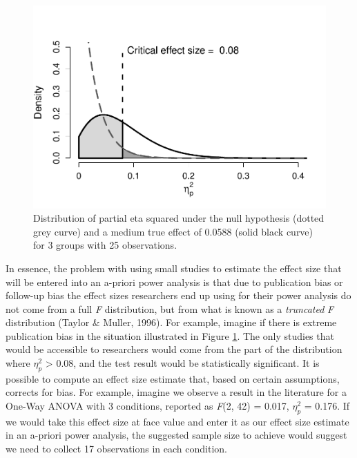 \documentclass[
  english,
  ,jou,floatsintext]{apa6}
\begin{document}
\begin{figure}
\centering
\includegraphics{sample_size_justification_files/figure-latex/follow-up-bias-1.pdf}
\caption{\label{fig:follow-up-bias}Distribution of partial eta squared under the null hypothesis (dotted grey curve) and a medium true effect of 0.0588 (solid black curve) for 3 groups with 25 observations.}
\end{figure}

In essence, the problem with using small studies to estimate the effect size that will be entered into an a-priori power analysis is that due to publication bias or follow-up bias the effect sizes researchers end up using for their power analysis do not come from a full \emph{F} distribution, but from what is known as a \emph{truncated} \emph{F} distribution (Taylor \& Muller, 1996). For example, imagine if there is extreme publication bias in the situation illustrated in Figure \ref{fig:follow-up-bias}. The only studies that would be accessible to researchers would come from the part of the distribution where \(\eta_p^2\) \textgreater{} 0.08, and the test result would be statistically significant. It is possible to compute an effect size estimate that, based on certain assumptions, corrects for bias. For example, imagine we observe a result in the literature for a One-Way ANOVA with 3 conditions, reported as \emph{F}(2, 42) = 0.017, \(\eta_p^2\) = 0.176. If we would take this effect size at face value and enter it as our effect size estimate in an a-priori power analysis, the suggested sample size to achieve would suggest we need to collect 17 observations in each condition.
\end{document}

